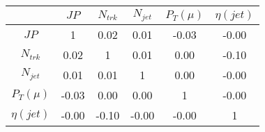 \begin{tabular}{|c|c|c|c|c|c|} 
\hline
 & $JP$ & $N_{trk}$ & $N_{jet}$ & $P_{T} (\mu)$ & $\eta (jet)$ \\ \hline
$JP$ & 1 & 0.02 & 0.01 & -0.03 & -0.00 \\
$N_{trk}$ & 0.02 & 1 & 0.01 & 0.00 & -0.10 \\
$N_{jet}$ & 0.01 & 0.01 & 1 & 0.00 & -0.00 \\
$P_{T} (\mu)$ & -0.03 & 0.00 & 0.00 & 1 & -0.00 \\
$\eta (jet)$ & -0.00 & -0.10 & -0.00 & -0.00 & 1 \\
\hline 
\end{tabular} 


